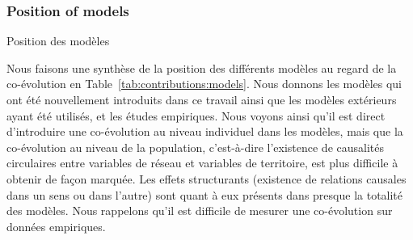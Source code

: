 \subsubsection{Position of models}{Position des modèles}

Nous faisons une synthèse de la position des différents modèles au regard de la co-évolution en Table~\ref{tab:contributions:models}. Nous donnons les modèles qui ont été nouvellement introduits dans ce travail ainsi que les modèles extérieurs ayant été utilisés, et les études empiriques. Nous voyons ainsi qu'il est direct d'introduire une co-évolution au niveau individuel dans les modèles, mais que la co-évolution au niveau de la population, c'est-à-dire l'existence de causalités circulaires entre variables de réseau et variables de territoire, est plus difficile à obtenir de façon marquée. Les effets structurants (existence de relations causales dans un sens ou dans l'autre) sont quant à eux présents dans presque la totalité des modèles. Nous rappelons qu'il est difficile de mesurer une co-évolution sur données empiriques.



